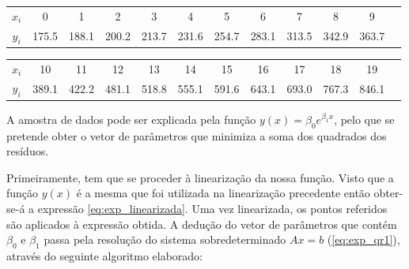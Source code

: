 \documentclass[]{article}
\numberwithin{equation}{subsection}
\begin{document}
\begin{table}[h]
\centering
\begin{tabular}{c|ccccccccccc}
\hline
\textbf{\(x_i\)} & 0 & 1 & 2 & 3 & 4 & 5 & 6 & 7 & 8 & 9 \\
\textbf{\(y_i\)} & 175.5 & 188.1 & 200.2 & 213.7 & 231.6 & 254.7 & 283.1 & 313.5 & 342.9 & 363.7  \\
\hline
\end{tabular}
\end{table}

\begin{table}[h]
\centering
\begin{tabular}{c|ccccccccccc}
\hline
\textbf{\(x_i\)} & 10 & 11 & 12 & 13 & 14 & 15 & 16 & 17 & 18 & 19 \\
\textbf{\(y_i\)} & 389.1 & 422.2 & 481.1 & 518.8 & 555.1 & 591.6 & 643.1 & 693.0  & 767.3 & 846.1 \\
\hline
\end{tabular}
\end{table}

A amostra de dados pode ser explicada pela função
\(y(x)=\beta_{0} e^{\beta_{1}x}\), pelo que se pretende obter o vetor de
parâmetros que minimiza a soma dos quadrados dos resíduos.

Primeiramente, tem que se proceder à linearização da nossa função. Visto
que a função \(y(x)\) é a mesma que foi utilizada na linearização
precedente então obter-se-á a expressão \ref{eq:exp_linearizada}. Uma
vez linearizada, os pontos referidos são aplicados à expressão obtida. A
dedução do vetor de parâmetros que contém \(\beta_{0}\) e \(\beta_{1}\)
passa pela resolução do sistema sobredeterminado \(Ax=b\)
(\ref{eq:exp_qr1}), através do seguinte algoritmo elaborado:
\end{document}
